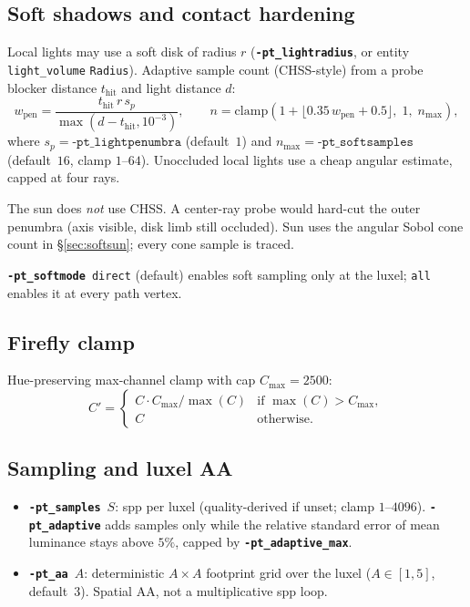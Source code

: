 \documentclass[11pt,a4paper]{article}
\newcommand{\flag}[1]{\texttt{\bfseries #1}}
\newcommand{\ent}[1]{\texttt{#1}}
\newcommand{\code}[1]{\texttt{#1}}
\begin{document}
\subsection{Soft shadows and contact hardening}
\label{sec:chss}

Local lights may use a soft disk of radius $r$ (\flag{-pt\_lightradius}, or
entity \ent{light\_volume} \code{Radius}). Adaptive sample count (CHSS-style)
from a probe blocker distance $t_{\mathrm{hit}}$ and light distance $d$:
\begin{equation}
  w_{\mathrm{pen}}
  =
  \frac{t_{\mathrm{hit}}\, r\, s_p}
       {\max(d-t_{\mathrm{hit}},10^{-3})},
  \qquad
  n
  =
  \mathrm{clamp}\!\left(
    1+\bigl\lfloor 0.35\,w_{\mathrm{pen}}+0.5\bigr\rfloor,\;
    1,\; n_{\max}
  \right),
\end{equation}
where $s_p=\texttt{-pt\_lightpenumbra}$ (default~$1$) and
$n_{\max}=\texttt{-pt\_softsamples}$ (default~$16$, clamp $1$--$64$).
Unoccluded local lights use a cheap angular estimate, capped at four rays.

The sun does \emph{not} use CHSS. A center-ray probe would hard-cut the outer
penumbra (axis visible, disk limb still occluded). Sun uses the angular Sobol
cone count in \S\ref{sec:softsun}; every cone sample is traced.

\flag{-pt\_softmode}~\code{direct} (default) enables soft sampling only at the
luxel; \code{all} enables it at every path vertex.

\subsection{Firefly clamp}

Hue-preserving max-channel clamp with cap $C_{\max}=2500$:
\begin{equation}
  C'
  =
  \begin{cases}
    C\cdot C_{\max}/\max(C) & \text{if }\max(C)>C_{\max},\\
    C & \text{otherwise.}
  \end{cases}
\end{equation}

\subsection{Sampling and luxel AA}

\begin{itemize}[leftmargin=1.4em]
  \item \flag{-pt\_samples}~$S$: spp per luxel (quality-derived if unset;
        clamp $1$--$4096$). \flag{-pt\_adaptive} adds samples only while the
        relative standard error of mean luminance stays above $5\%$, capped by
        \flag{-pt\_adaptive\_max}.
  \item \flag{-pt\_aa}~$A$: deterministic $A\times A$ footprint grid over the
        luxel ($A\in[1,5]$, default~$3$). Spatial AA, not a multiplicative spp loop.
\end{itemize}
\end{document}
